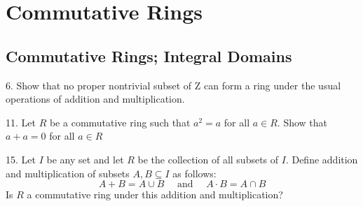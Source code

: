 \section{Commutative Rings}
\subsection{Commutative Rings; Integral Domains}
\begin{mdframed}[style=darkQuesion]
  6. Show that no proper nontrivial subset of Z can form a ring under the usual operations of addition and multiplication.
\end{mdframed}
\begin{mdframed}[style=darkAnswer,frametitle={Joe Starr}]
\end{mdframed}
\newpage
\begin{mdframed}[style=darkQuesion]
  11. Let $R$ be a commutative ring such that $a^{2}=a$ for all $a \in R .$ Show that $a+a=0$ for all $a \in R$
\end{mdframed}
\begin{mdframed}[style=darkAnswer,frametitle={Joe Starr}]
\end{mdframed}
\newpage
\begin{mdframed}[style=darkQuesion]
  15. Let $I$ be any set and let $R$ be the collection of all subsets of $I$. Define addition and multiplication of subsets $A, B \subseteq I$ as follows:
$$
A+B=A \cup B \quad \text { and } \quad A \cdot B=A \cap B
$$
Is $R$ a commutative ring under this addition and multiplication?
\end{mdframed}
